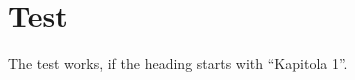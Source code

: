 \documentclass[main]{subfiles}
\begin{document}
\chapter{Test}

The test works, if the heading starts with ``Kapitola 1''.
\end{document}

